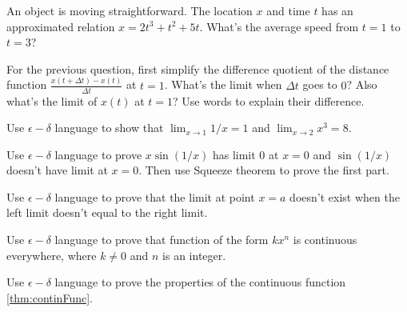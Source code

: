 \documentclass[Calculus 1 Recitation.tex]{subfiles}
\begin{document}
\begin{myleftlinebox}
	An object is moving straightforward. The location $x$ and time $t$ has an approximated relation $x = 2t^3+t^2+5t$. What's the average speed from $t=1$ to $t=3$?
	\tcblower
	\vspace{2em}
\end{myleftlinebox}

\begin{myleftlinebox}
	For the previous question, first simplify the difference quotient of the distance function $\frac{x(t+\Delta t)-x(t)}{\Delta t}$ at $t=1$. What's the limit when $\Delta t$ goes to $0$? Also what's the limit of $x(t)$ at $t=1$? Use words to explain their difference.
	\tcblower
	\vspace{2em}
\end{myleftlinebox}


\begin{myleftlinebox}
	Use $\epsilon-\delta$ language to show that $\lim_{x\to 1} 1/x = 1$ and $\lim_{x\to 2} x^3 = 8$.
	\tcblower
	\vspace{2em}
\end{myleftlinebox}

\begin{myleftlinebox}
	Use $\epsilon-\delta$ language to prove $x\sin(1/x)$ has limit $0$ at $x=0$ and $\sin(1/x)$ doesn't have limit at $x=0$. Then use Squeeze theorem to prove the first part.
	\tcblower
	\vspace{2em}
\end{myleftlinebox}

\begin{myleftlinebox}
	Use $\epsilon-\delta$ language to prove that the limit at point $x=a$ doesn't exist when the left limit doesn't equal to the right limit.
	\tcblower
	\vspace{2em}
\end{myleftlinebox}

\begin{myleftlinebox}
	Use $\epsilon-\delta$ language to prove that function of the form $k x^n$ is continuous everywhere, where $k\neq 0$ and $n$ is an integer.
	\tcblower
	\vspace{2em}
\end{myleftlinebox}

\begin{myleftlinebox}
	Use $\epsilon-\delta$ language to prove the properties of the continuous function \autoref {thm:continFunc}.
	\tcblower
	\vspace{2em}
\end{myleftlinebox}
\end{document}
